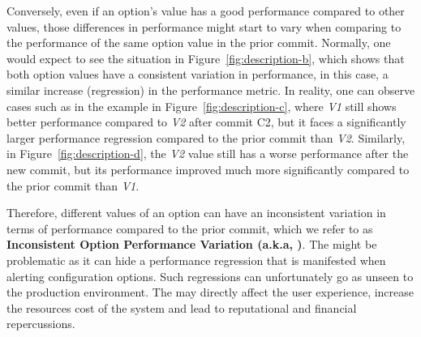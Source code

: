 Conversely, even if an option's value has a good performance compared to other values, those differences in performance might start to vary %
when comparing to the performance of the same option value in the prior commit. Normally, one would expect to see the situation in Figure~\ref{fig:description-b}, which shows that both option values have a consistent variation in performance, in this case, a similar increase (regression) in the performance metric. In reality, one can observe %
cases such as in the example in Figure~\ref{fig:description-c}, where \emph{V1} still shows better performance compared to \emph{V2} after commit C2, but it faces a significantly larger performance regression compared to the prior commit than \emph{V2}. Similarly, in Figure~\ref{fig:description-d}, the \emph{V2} value still has a worse performance after the new commit, but its performance improved much more significantly compared to the prior commit than \emph{V1}.

Therefore, different values of an option can have an inconsistent variation in terms of performance compared to the prior commit, which %
we refer to as \textbf{Inconsistent Option Performance Variation (a.k.a, \inconsistent)}. The \inconsistent might be problematic as it can hide a performance regression that is manifested when alerting configuration options. %
Such regressions can unfortunately go as unseen to the production environment. The \inconsistent may directly affect the user experience, increase the resources cost of the system and lead to reputational and financial repercussions. 

